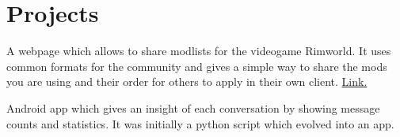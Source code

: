 \documentclass[]{plushcv}
\begin{document}
\begin{minipage}[t]{0.25\textwidth}
    \sectionsep

    \section{Projects}

    A webpage which allows to share modlists for the videogame Rimworld. It uses common formats for the community and gives a simple way to share the mods you are using and their order for others to apply in their own client. \href{https://sharemods.jacobrr.me/}{Link.}
    \sectionsep

    Android app which gives an insight of each conversation by showing message counts and statistics. It was initially a python script which evolved into an app.
    \sectionsep

\end{minipage}
\end{document}
